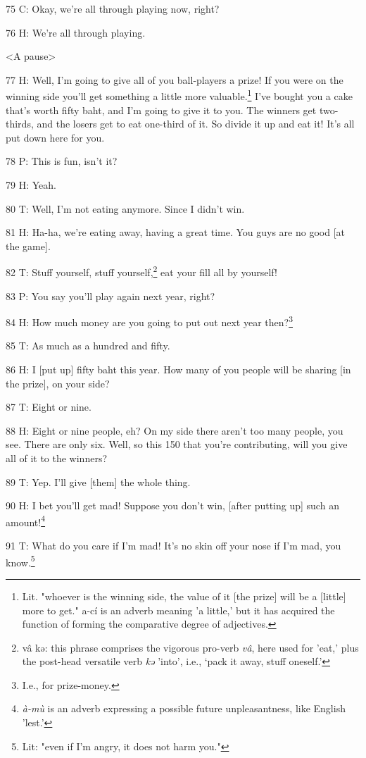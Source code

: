 75 C: Okay, we're all through playing now, right?

76 H: We're all through playing.

<A pause>

77 H: Well, I'm going to give all of you ball-players a prize! If you were on the
winning side you'll get something a little more valuable.\footnote{Lit. "whoever is the winning side, the value of it [the prize] will be a [little] more to get." a-cí is an adverb meaning 'a little,' but it has acquired the function of forming the comparative degree of adjectives.} I've bought you a
cake that's worth fifty baht, and I'm going to give it to you. The winners get
two-thirds, and the losers get to eat one-third of it. So divide it up and eat
it! It's all put down here for you.

78 P: This is fun, isn't it?

79 H: Yeah.

80 T: Well, I'm not eating anymore. Since I didn't win.

81 H: Ha-ha, we're eating away, having a great time. You guys are no good [at the
game].

82 T: Stuff yourself, stuff yourself,\footnote{vâ kə: this phrase comprises the vigorous pro-verb \textit{vâ}, here used for 'eat,' plus the post-head versatile verb \textit{kə} 'into', i.e., `pack it away, stuff oneself.'} eat your fill all by yourself!

83 P: You say you'll play again next year, right?

84 H: How much money are you going to put out next year then?\footnote{I.e., for prize-money.}

85 T: As much as a hundred and fifty.

86 H: I [put up] fifty baht this year. How many of you people will be sharing [in
the prize], on your side?

87 T: Eight or nine.

88 H: Eight or nine people, eh? On my side there aren't too many people, you see.
There are only six. Well, so this 150 that you're contributing, will you give all
of it to the winners?

89 T: Yep. I'll give [them] the whole thing.

90 H: I bet you'll get mad! Suppose you don't win, [after putting up] such an amount!\footnote{\textit{à-mù} is an adverb expressing a possible future unpleasantness, like English 'lest.'}

91 T: What do you care if I'm mad! It's no skin off your nose if I'm mad, you know.\footnote{Lit: "even if I'm angry, it does not harm you."}

